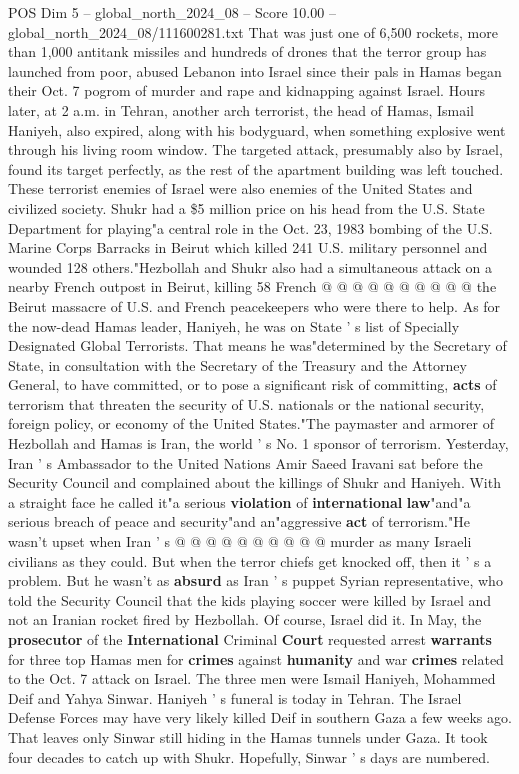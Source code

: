 \begin{textsample}{POS Dim 5 – global\_north\_2024\_08 – Score 10.00 – global\_north\_2024\_08/111600281.txt}  \label{ex:f5_pos_398}
That was just one of 6,500 rockets, more than 1,000 antitank missiles and hundreds of drones that the terror group has launched from poor, abused Lebanon into Israel since their pals in Hamas began their Oct. 7 pogrom of murder and rape and kidnapping against Israel.
Hours later, at 2 a.m. in Tehran, another arch terrorist, the head of Hamas, Ismail Haniyeh, also expired, along with his bodyguard, when something explosive went through his living room window.
The targeted attack, presumably also by Israel, found its target perfectly, as the rest of the apartment building was left touched.
These terrorist enemies of Israel were also enemies of the United States and civilized society.
Shukr had a \$5 million price on his head from the U.S.
State Department for playing"a central role in the Oct. 23, 1983 bombing of the U.S.
Marine Corps Barracks in Beirut which killed 241 U.S. military personnel and wounded 128 others."Hezbollah and Shukr also had a simultaneous attack on a nearby French outpost in Beirut, killing 58 French @ @ @ @ @ @ @ @ @ @ the Beirut massacre of U.S. and French peacekeepers who were there to help.
As for the now-dead Hamas leader, Haniyeh, he was on State ' s list of Specially Designated Global Terrorists.
That means he was"determined by the Secretary of State, in consultation with the Secretary of the Treasury and the Attorney General, to have committed, or to pose a significant risk of committing, \textbf{acts} of terrorism that threaten the security of U.S. nationals or the national security, foreign policy, or economy of the United States."The paymaster and armorer of Hezbollah and Hamas is Iran, the world ' s No. 1 sponsor of terrorism.
Yesterday, Iran ' s Ambassador to the United Nations Amir Saeed Iravani sat before the Security Council and complained about the killings of Shukr and Haniyeh.
With a straight face he called it"a serious \textbf{violation} of \textbf{international} \textbf{law}"and"a serious breach of peace and security"and an"aggressive \textbf{act} of terrorism."He wasn't upset when Iran ' s @ @ @ @ @ @ @ @ @ @ murder as many Israeli civilians as they could.
But when the terror chiefs get knocked off, then it ' s a problem.
But he wasn't as \textbf{absurd} as Iran ' s puppet Syrian representative, who told the Security Council that the kids playing soccer were killed by Israel and not an Iranian rocket fired by Hezbollah.
Of course, Israel did it.
In May, the \textbf{prosecutor} of the \textbf{International} Criminal \textbf{Court} requested arrest \textbf{warrants} for three top Hamas men for \textbf{crimes} against \textbf{humanity} and war \textbf{crimes} related to the Oct. 7 attack on Israel.
The three men were Ismail Haniyeh, Mohammed Deif and Yahya Sinwar.
Haniyeh ' s funeral is today in Tehran.
The Israel Defense Forces may have very likely killed Deif in southern Gaza a few weeks ago.
That leaves only Sinwar still hiding in the Hamas tunnels under Gaza.
It took four decades to catch up with Shukr.
Hopefully, Sinwar ' s days are numbered.

\end{textsample}
